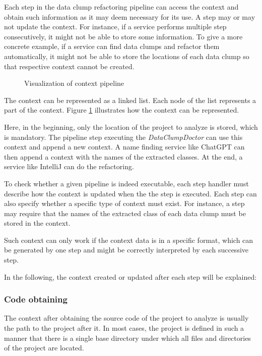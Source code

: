 Each step in the data clump refactoring pipeline can access the context and obtain such information as it may deem necessary for its use. A step may or may not update the context. For instance, if a service performs multiple step consecutively, it might not be able to store some information. To give a more concrete example, if a service can find data clumps and refactor them automatically, it might not be able to store the locations of each data clump so that respective context cannot be created. 

\begin{figure}
    \centering
    
    \caption{Visualization of context pipeline}
    \label{fig:context_pipeline}
\end{figure}

The context can be represented as a linked list. Each node of the list represents a part of the context. Figure \ref{fig:context_pipeline} illustrates how the context can be  represented.

Here, in the beginning, only the location of the project to analyze is stored, which is mandatory. The pipeline step executing the \textit{DataClumpDoctor} can use this context and append a new context. A name finding service like ChatGPT can then append a context with the names of the extracted classes. At the end, a service like IntelliJ can do the refactoring.

To check whether a given pipeline is indeed executable, each step handler must describe how the context is updated when the the step is executed. Each step can also specify whether a specific type of context must exist. For instance, a step may require that the names of the extracted class of each data clump must be stored in the context.  

Such context can only work if the context data is in a specific format, which can be generated by one step and might be correctly interpreted by each successive step. 

In the following, the context created or updated after each step will be explained:

\subsubsection{Code obtaining}
The context after obtaining the source code of the project to analyze is usually the path to the project after it. In most cases, the project is defined in such a manner that there is a single base directory under which all files and directories of the project are located.


